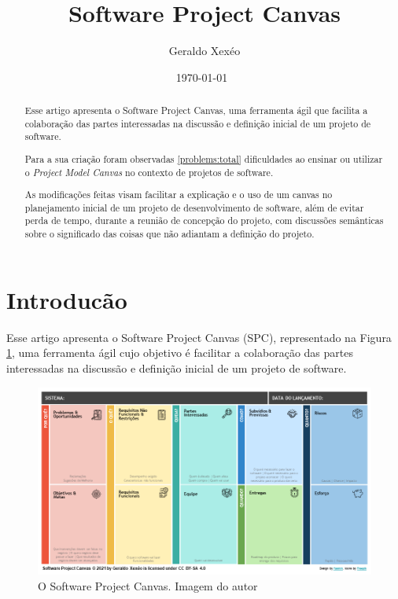 \documentclass{article}
\title{Software Project Canvas}
\author{Geraldo Xexéo}
\date{\today \ \DTMcurrenttime }
\begin{document}
\maketitle

\begin{abstract}
\hspace*{\parindent}Esse artigo apresenta o Software Project Canvas, uma ferramenta ágil que facilita a colaboração das partes interessadas na  discussão e definição inicial de um projeto de software.

Para a sua  criação foram observadas \ref{problems:total} dificuldades  ao ensinar ou utilizar o \textit{Project Model Canvas} no contexto de projetos de software.

As modificações feitas visam facilitar a explicação e o uso de um canvas no planejamento inicial de um projeto de desenvolvimento de software, além de evitar perda de tempo, durante a reunião de concepção do projeto, com discussões semânticas sobre o significado das coisas que não adiantam a definição do projeto.
\end{abstract}

\section{Introducão}

Esse artigo apresenta o Software Project Canvas (SPC), representado na Figura \ref{fig:spc}, uma ferramenta ágil cujo objetivo é facilitar a colaboração das partes interessadas na  discussão e definição inicial de um projeto de software.

\begin{figure}[hbt]
    \centering
    \includegraphics[width=\textwidth]{imagens/Software Project Canvas Yasmin 1.png}
    \caption{O Software Project Canvas. Imagem do autor}
    \label{fig:spc}
\end{figure}
\end{document}
